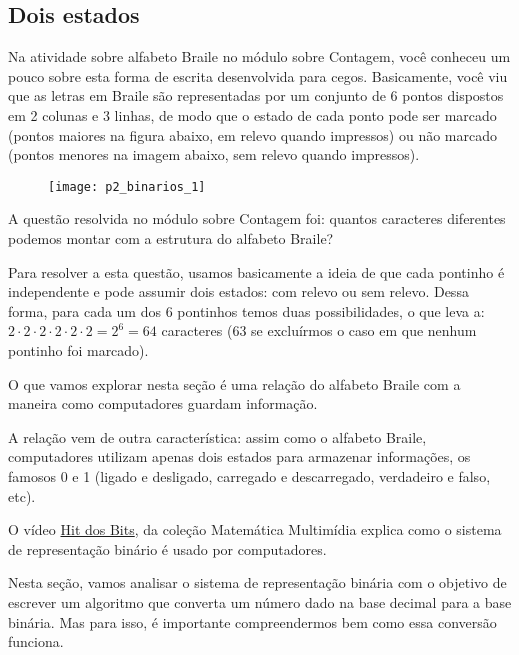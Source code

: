 \subsection{Dois estados}

Na atividade sobre alfabeto Braile no módulo sobre Contagem, você conheceu um pouco sobre esta forma de escrita desenvolvida para cegos. Basicamente, você viu que as letras em Braile são representadas por um conjunto de 6 pontos dispostos em 2 colunas e 3 linhas, de modo que o estado de cada ponto pode ser marcado (pontos maiores na figura abaixo, em relevo quando impressos) ou não marcado (pontos menores na imagem abaixo, sem relevo quando impressos).

\begin{figure}[H]
\centering

\texttt{[image: p2\_binarios\_1]}
\end{figure}

A questão resolvida no módulo sobre Contagem foi: quantos caracteres diferentes podemos montar com a estrutura do alfabeto Braile?

Para resolver a esta questão, usamos basicamente a ideia de que cada pontinho é independente e pode assumir dois estados: com relevo ou sem relevo. Dessa forma, para cada um dos 6 pontinhos temos duas possibilidades, o que leva a: $2\cdot2\cdot2\cdot2\cdot2\cdot2=2^6=64$ caracteres ($63$ se excluírmos o caso em que nenhum pontinho foi marcado).

O que vamos explorar nesta seção é uma relação do alfabeto Braile com a maneira como computadores guardam informação.

A relação vem de outra característica: assim como o alfabeto Braile, computadores utilizam apenas dois estados para armazenar informações, os famosos 0 e 1 (ligado e desligado, carregado e descarregado, verdadeiro e falso, etc).

O vídeo \href{https://m3.ime.unicamp.br/recursos/1116}{Hit dos Bits}, da coleção Matemática Multimídia explica como o sistema de representação binário é usado por computadores.

Nesta seção, vamos analisar o sistema de representação binária com o objetivo de escrever um algoritmo que converta um número dado na base decimal para a base binária. Mas para isso, é importante compreendermos bem como essa conversão funciona.

